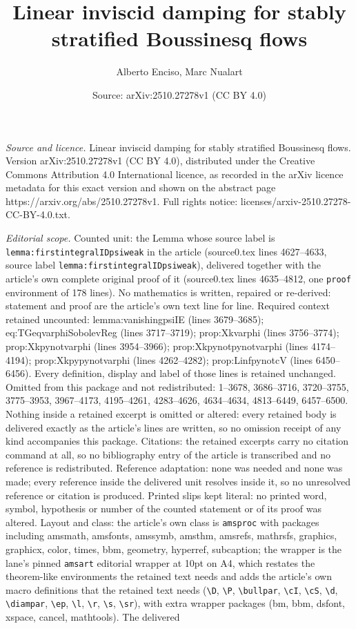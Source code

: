 \documentclass[10pt,a4paper]{amsart}
\title[Linear inviscid damping for stably stratified Boussinesq flo]{Linear inviscid damping for stably stratified Boussinesq flows}
\author{Alberto Enciso, Marc Nualart}
\date{Source: arXiv:2510.27278v1 (CC BY 4.0)}
\begin{document}
\maketitle

\noindent\emph{Source and licence.} Linear inviscid damping for stably stratified Boussinesq flows. Version arXiv:2510.27278v1 (CC BY 4.0), distributed under the Creative Commons Attribution 4.0 International licence, as recorded in the arXiv licence metadata for this exact version and shown on the abstract page https://arxiv.org/abs/2510.27278v1. Full rights notice: licenses/arxiv-2510.27278-CC-BY-4.0.txt.\par\smallskip

\noindent\textit{Editorial scope.} Counted unit: the Lemma whose source label is \texttt{lemma:firstintegralIDpsiweak} in the article (source0.tex lines 4627--4633, source label \texttt{lemma:firstintegralIDpsiweak}), delivered together with the article's own complete original proof of it (source0.tex lines 4635--4812, one \texttt{proof} environment of 178 lines). No mathematics is written, repaired or re-derived: statement and proof are the article's own text line for line. Required context retained uncounted: lemma:vanishingpsiIE (lines 3679--3685); eq:TGeqvarphiSobolevReg (lines 3717--3719); prop:Xkvarphi (lines 3756--3774); prop:Xkpynotvarphi (lines 3954--3966); prop:Xkpynotpynotvarphi (lines 4174--4194); prop:Xkpypynotvarphi (lines 4262--4282); prop:LinfpynotcV (lines 6450--6456). Every definition, display and label of those lines is retained unchanged. Omitted from this package and not redistributed: 1--3678, 3686--3716, 3720--3755, 3775--3953, 3967--4173, 4195--4261, 4283--4626, 4634--4634, 4813--6449, 6457--6500. Nothing inside a retained excerpt is omitted or altered: every retained body is delivered exactly as the article's lines are written, so no omission receipt of any kind accompanies this package. Citations: the retained excerpts carry no citation command at all, so no bibliography entry of the article is transcribed and no reference is redistributed. Reference adaptation: none was needed and none was made; every reference inside the delivered unit resolves inside it, so no unresolved reference or citation is produced. Printed slips kept literal: no printed word, symbol, hypothesis or number of the counted statement or of its proof was altered. Layout and class: the article's own class is \texttt{amsproc} with packages including amsmath, amsfonts, amssymb, amsthm, amsrefs, mathrsfs, graphics, graphicx, color, times, bbm, geometry, hyperref, subcaption; the wrapper is the lane's pinned \texttt{amsart} editorial wrapper at 10pt on A4, which restates the theorem-like environments the retained text needs and adds the article's own macro definitions that the retained text needs (\texttt{\textbackslash D}, \texttt{\textbackslash P}, \texttt{\textbackslash bullpar}, \texttt{\textbackslash cI}, \texttt{\textbackslash cS}, \texttt{\textbackslash d}, \texttt{\textbackslash diampar}, \texttt{\textbackslash ep}, \texttt{\textbackslash l}, \texttt{\textbackslash r}, \texttt{\textbackslash s}, \texttt{\textbackslash sr}), with extra wrapper packages (bm, bbm, dsfont, xspace, cancel, mathtools). The delivered 
\end{document}
